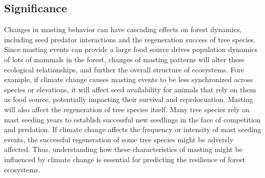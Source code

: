 \documentclass[11pt,letter]{article}
\begin{document}
\subsection{Significance}
Changes in masting behavior can have cascading effects on forest dynamics, including seed predator interactions and the regeneration success of tree species. Since masting events can provide a large food source drives population dynamics of lots of mammals in the forest, changes of masting patterns will alter these ecological relationships, and further the overall structure of ecosystems. Fore example, if climate change causes masting events to be less synchronized across species or elevations, it will affect seed availability for animals that rely on them as food source, potentially impacting their survival and reprdocuation.
Masting will also affect the regeneration of tree species itself. Many tree species rely on mast seeding years to establish successful new seedlings in the face of competition and predation. If climate change affects the frequency or intensity of mast seeding events, the successful regeneration of some tree species might be adversly affected. Thus, understanding how these characteristics of masting might be influenced by climate change is essential for predicting the resilience of forest ecosystems.


 
\end{document}
